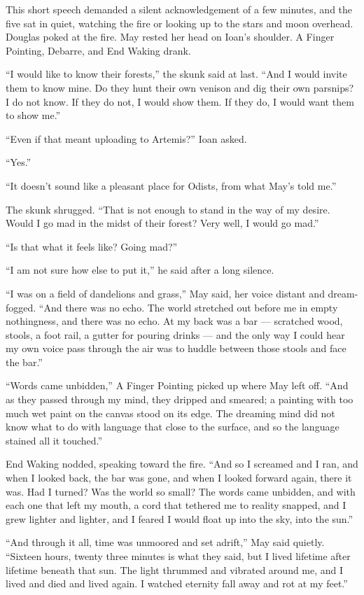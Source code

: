 This short speech demanded a silent acknowledgement of a few minutes, and the five sat in quiet, watching the fire or looking up to the stars and moon overhead. Douglas poked at the fire. May rested her head on Ioan's shoulder. A Finger Pointing, Debarre, and End Waking drank.

``I would like to know their forests,'' the skunk said at last. ``And I would invite them to know mine. Do they hunt their own venison and dig their own parsnips? I do not know. If they do not, I would show them. If they do, I would want them to show me.''

``Even if that meant uploading to Artemis?'' Ioan asked.

``Yes.''

``It doesn't sound like a pleasant place for Odists, from what May's told me.''

The skunk shrugged. ``That is not enough to stand in the way of my desire. Would I go mad in the midst of their forest? Very well, I would go mad.''

``Is that what it feels like? Going mad?''

``I am not sure how else to put it,'' he said after a long silence.

``I was on a field of dandelions and grass,'' May said, her voice distant and dream-fogged. ``And there was no echo. The world stretched out before me in empty nothingness, and there was no echo. At my back was a bar — scratched wood, stools, a foot rail, a gutter for pouring drinks — and the only way I could hear my own voice pass through the air was to huddle between those stools and face the bar.''

``Words came unbidden,'' A Finger Pointing picked up where May left off. ``And as they passed through my mind, they dripped and smeared; a painting with too much wet paint on the canvas stood on its edge. The dreaming mind did not know what to do with language that close to the surface, and so the language stained all it touched.''

End Waking nodded, speaking toward the fire. ``And so I screamed and I ran, and when I looked back, the bar was gone, and when I looked forward again, there it was. Had I turned? Was the world so small? The words came unbidden, and with each one that left my mouth, a cord that tethered me to reality snapped, and I grew lighter and lighter, and I feared I would float up into the sky, into the sun.''

``And through it all, time was unmoored and set adrift,'' May said quietly. ``Sixteen hours, twenty three minutes is what they said, but I lived lifetime after lifetime beneath that sun. The light thrummed and vibrated around me, and I lived and died and lived again. I watched eternity fall away and rot at my feet.''

